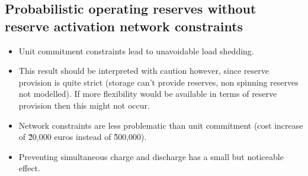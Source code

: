 \documentclass[number,times]{elsarticle}
\begin{document}
\subsection{Probabilistic operating reserves without reserve activation network constraints}

\begin{itemize}
    \item Unit commitment constraints lead to unavoidable load shedding.
    \item This result should be interpreted with caution however, since reserve provision is quite strict (storage can't provide reserves, non spinning reserves not modelled). If more flexibility would be available in terms of reserve provision then this might not occur.
    \item Network constraints are less problematic than unit commitment (cost increase of \~20,000 euros instead of \~500,000).
    \item Preventing simultaneous charge and discharge has a small but noticeable effect.
\end{itemize}
\end{document}

